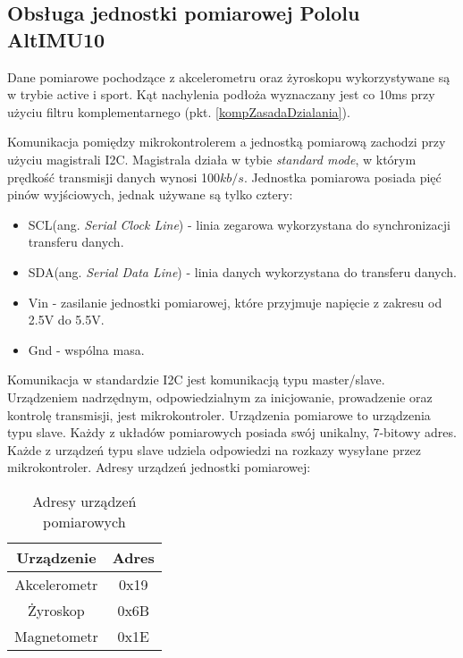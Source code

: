 \subsection{Obsługa jednostki pomiarowej Pololu AltIMU10}
Dane pomiarowe pochodzące z akcelerometru oraz żyroskopu wykorzystywane są w trybie active i sport. Kąt nachylenia podłoża wyznaczany jest co 10ms przy użyciu filtru komplementarnego (pkt. \ref{kompZasadaDzialania}). 
 
Komunikacja pomiędzy mikrokontrolerem a jednostką pomiarową zachodzi przy użyciu magistrali I2C. Magistrala działa w tybie \textit{standard mode}, w którym prędkość transmisji danych wynosi 100$kb/s$. Jednostka pomiarowa posiada pięć pinów wyjściowych, jednak używane są tylko cztery:
\begin{itemize}
    \item
    SCL(ang. {\em Serial Clock Line}) - linia zegarowa wykorzystana do synchronizacji transferu danych.
    \item
    SDA(ang. {\em Serial Data Line}) - linia danych wykorzystana do transferu danych.
    \item
    Vin - zasilanie jednostki pomiarowej, które przyjmuje napięcie z zakresu od 2.5V do 5.5V.
    \item
    Gnd - wspólna masa.
\end{itemize} 

Komunikacja w standardzie I2C jest komunikacją typu master/slave. Urządzeniem nadrzędnym, odpowiedzialnym za inicjowanie, prowadzenie oraz kontrolę transmisji, jest mikrokontroler. Urządzenia pomiarowe to urządzenia typu slave. Każdy z układów pomiarowych posiada swój unikalny, 7-bitowy adres. Każde z urządzeń typu slave udziela odpowiedzi na rozkazy wysyłane przez mikrokontroler. Adresy urządzeń jednostki pomiarowej:

\begin{table}[h]
    \caption{Adresy urządzeń pomiarowych}
    \begin{center}
		\label{tab:adresyImu}
		\begin{tabular}{|c|c|}
			\hline
 			\textbf{Urządzenie} & \textbf{Adres} \\
 			\hline
 			Akcelerometr & 0x19 \\  
 			\hline
			Żyroskop & 0x6B \\
			\hline
			Magnetometr & 0x1E \\  
			\hline
		\end{tabular}
	\end{center}
\end{table}

